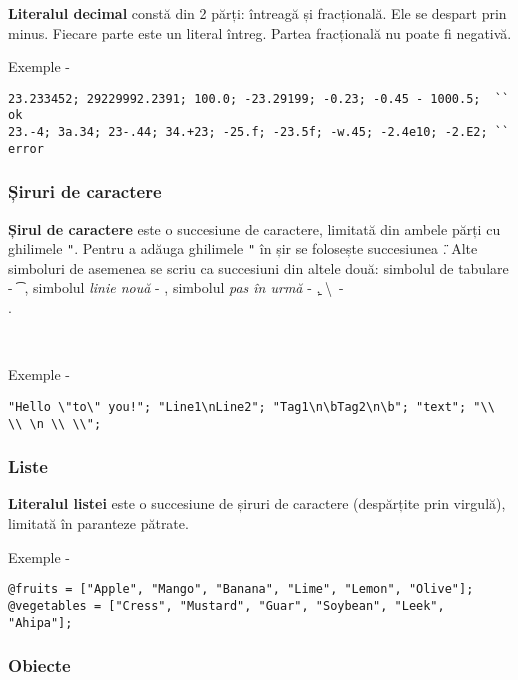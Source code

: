 {\bf Literalul decimal} constă din 2 părți: întreagă și fracțională. Ele se despart prin minus. Fiecare parte este un literal întreg. Partea fracțională nu poate fi negativă.

\noindent Exemple -
\begin{verbatim}
23.233452; 29229992.2391; 100.0; -23.29199; -0.23; -0.45 - 1000.5;  `` ok
23.-4; 3a.34; 23-.44; 34.+23; -25.f; -23.5f; -w.45; -2.4e10; -2.E2; `` error
\end{verbatim}

\subsubsection{Șiruri de caractere}

{\bf Șirul de caractere} este o succesiune de caractere, limitată din ambele părți cu ghilimele \texttt{"}. Pentru a adăuga ghilimele \texttt{"} în șir se folosește succesiunea \texttt{\"}. Alte simboluri de asemenea se scriu ca succesiuni din altele două: simbolul de tabulare - \texttt{\t}, simbolul {\it linie nouă} - \texttt{\n}, simbolul {\it pas în urmă} - \texttt{\b}, \textbackslash \ - \texttt{\\}.

\

\noindent Exemple -
\begin{verbatim}
"Hello \"to\" you!"; "Line1\nLine2"; "Tag1\n\bTag2\n\b"; "text"; "\\ \\ \n \\ \\";
\end{verbatim}

\subsubsection{Liste}

{\bf Literalul listei} este o succesiune de șiruri de caractere (despărțite prin virgulă), limitată în paranteze pătrate.

\noindent Exemple -
\begin{verbatim}
@fruits = ["Apple", "Mango", "Banana", "Lime", "Lemon", "Olive"];
@vegetables = ["Cress", "Mustard", "Guar", "Soybean", "Leek", "Ahipa"];
\end{verbatim}

\subsubsection{Obiecte}

